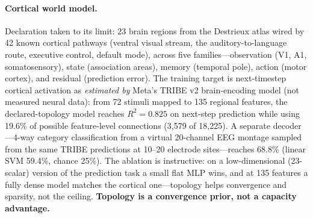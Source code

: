 \documentclass[10pt,twocolumn]{article}
\begin{document}
\paragraph{Cortical world model.}
Declaration taken to its limit: 23 brain regions from the Destrieux atlas \cite{destrieux2010atlas} wired by 42 known cortical pathways (ventral visual stream, the auditory-to-language route, executive control, default mode), across five families---observation (V1, A1, somatosensory), state (association areas), memory (temporal pole), action (motor cortex), and residual (prediction error). The training target is next-timestep cortical activation as \emph{estimated by} Meta's TRIBE v2 brain-encoding model \cite{tribev2} (not measured neural data): from 72 stimuli mapped to 135 regional features, the declared-topology model reaches $R^2 = 0.825$ on next-step prediction while using 19.6\% of possible feature-level connections (3{,}579 of 18{,}225). A separate decoder---4-way category classification from a virtual 20-channel EEG montage sampled from the same TRIBE predictions at 10--20 electrode sites---reaches 68.8\% (linear SVM 59.4\%, chance 25\%). The ablation is instructive: on a low-dimensional (23-scalar) version of the prediction task a small flat MLP wins, and at 135 features a fully dense model matches the cortical one---topology helps convergence and sparsity, not the ceiling. \textbf{Topology is a convergence prior, not a capacity advantage.}
\end{document}
